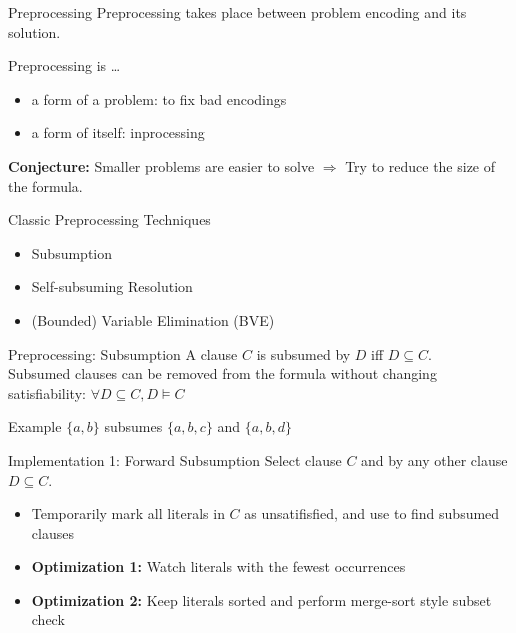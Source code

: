 \documentclass[t]{sdqbeamer}
\begin{document}
\begin{frame}{Preprocessing}
Preprocessing takes place between problem encoding and its solution.\\[1ex]
\begin{block}{Preprocessing is \dots}
\begin{itemize}
    \item a form of  a problem: to fix bad encodings
    \item a form of  itself: inprocessing
\end{itemize}
\end{block}
\textbf{Conjecture:} Smaller problems are easier to solve 
$\Longrightarrow$ Try to reduce the size of the formula.\\[1ex]
\begin{exampleblock}{Classic Preprocessing Techniques}
\begin{itemize}\setlength{\itemsep}{1ex}
    \item Subsumption
    \item Self-subsuming Resolution
    \item (Bounded) Variable Elimination (BVE)
\end{itemize}
\end{exampleblock}
\end{frame}


\begin{frame}{Preprocessing: Subsumption}
A clause $C$ is subsumed by $D$ iff $D \subseteq C$.\\[1ex]
Subsumed clauses can be removed from the formula without changing satisfiability: $\forall D \subseteq C, D \models C$
\begin{exampleblock}{Example}
    $\{a, b\}$ subsumes $\{a, b, c\}$ and $\{a, b, d\}$
\end{exampleblock}
\pause
\begin{block}{Implementation 1: Forward Subsumption}
Select clause $C$ and  by any other clause $D \subseteq C$.
\begin{itemize}\setlength{\itemsep}{1ex}
    \item Temporarily mark all literals in $C$ as unsatifisfied, and use  to find subsumed clauses
    \item \textbf{Optimization 1:} Watch literals with the fewest occurrences
    \item \textbf{Optimization 2:} Keep literals sorted and perform merge-sort style subset check
\end{itemize}
\end{block}
\end{frame}
\end{document}
